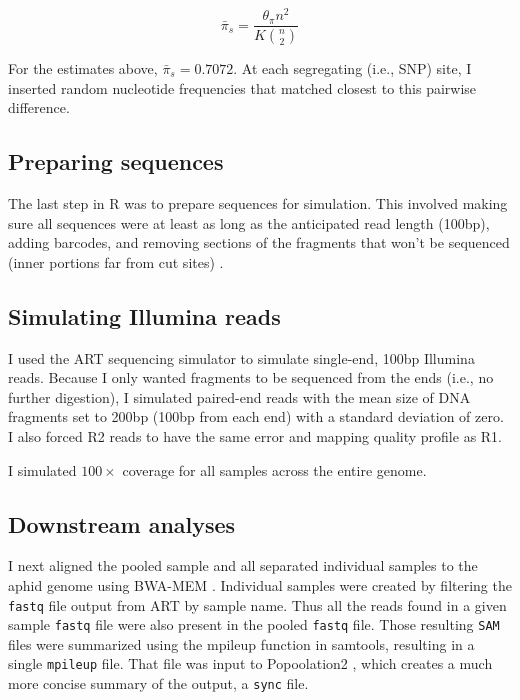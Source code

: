 \begin{equation} \label{eq:barpi_s}
    \bar{\pi}_{s} = \frac{\theta_\pi n^2}{K {n \choose 2}}
\end{equation}

For the estimates above, $\bar{\pi}_s = 0.7072$. At each segregating (i.e., SNP) site,
I inserted random nucleotide frequencies that matched closest to this pairwise
difference.

\subsection{Preparing sequences}

The last step in R was to prepare sequences for simulation.
This involved making sure all sequences were at least as long as the anticipated read 
length (100bp), adding barcodes, and removing sections of the fragments that won't be 
sequenced (inner portions far from cut sites) \citep{Elshire:2011gn,Davey:2011ip}.

\subsection{Simulating Illumina reads}

I used the ART sequencing simulator \citep{Huang:2012kq} to simulate single-end, 100bp
Illumina reads.
Because I only wanted fragments to be sequenced from the ends (i.e., no further 
digestion), I simulated paired-end reads with the mean size of DNA fragments set to
200bp (100bp from each end) with a standard deviation of zero.
I also forced R2 reads to have the same error and mapping quality profile as R1.

I simulated $100\times$ coverage for all samples across the entire genome.


\subsection{Downstream analyses}

I next aligned the pooled sample and all separated individual samples to the aphid genome
using BWA-MEM \citep{Li:2013wn}. 
Individual samples were created by filtering the \texttt{fastq} file output from ART
by sample name. Thus all the reads found in a given sample \texttt{fastq} file were also
present in the pooled \texttt{fastq} file.
Those resulting \texttt{SAM} files were summarized using the mpileup function in 
samtools, resulting in a single \texttt{mpileup} file.
That file was input to Popoolation2 \citep{Kofler:2011ds}, which creates a much more 
concise summary of the output, a \texttt{sync} file.


